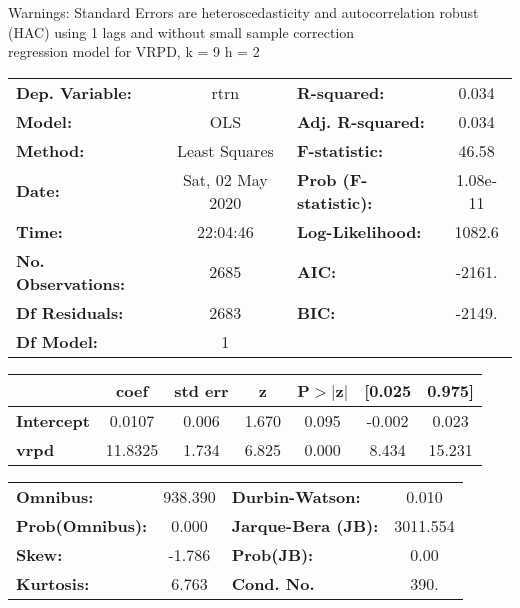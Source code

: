Warnings: \newline
 [1] Standard Errors are heteroscedasticity and autocorrelation robust (HAC) using 1 lags and without small sample correction\\ 

regression model for VRPD, k = 9 h = 2\begin{center}
\begin{tabular}{lclc}
\toprule
\textbf{Dep. Variable:}    &       rtrn       & \textbf{  R-squared:         } &     0.034   \\
\textbf{Model:}            &       OLS        & \textbf{  Adj. R-squared:    } &     0.034   \\
\textbf{Method:}           &  Least Squares   & \textbf{  F-statistic:       } &     46.58   \\
\textbf{Date:}             & Sat, 02 May 2020 & \textbf{  Prob (F-statistic):} &  1.08e-11   \\
\textbf{Time:}             &     22:04:46     & \textbf{  Log-Likelihood:    } &    1082.6   \\
\textbf{No. Observations:} &        2685      & \textbf{  AIC:               } &    -2161.   \\
\textbf{Df Residuals:}     &        2683      & \textbf{  BIC:               } &    -2149.   \\
\textbf{Df Model:}         &           1      & \textbf{                     } &             \\
\bottomrule
\end{tabular}
\begin{tabular}{lcccccc}
                   & \textbf{coef} & \textbf{std err} & \textbf{z} & \textbf{P$> |$z$|$} & \textbf{[0.025} & \textbf{0.975]}  \\
\midrule
\textbf{Intercept} &       0.0107  &        0.006     &     1.670  &         0.095        &       -0.002    &        0.023     \\
\textbf{vrpd}      &      11.8325  &        1.734     &     6.825  &         0.000        &        8.434    &       15.231     \\
\bottomrule
\end{tabular}
\begin{tabular}{lclc}
\textbf{Omnibus:}       & 938.390 & \textbf{  Durbin-Watson:     } &    0.010  \\
\textbf{Prob(Omnibus):} &   0.000 & \textbf{  Jarque-Bera (JB):  } & 3011.554  \\
\textbf{Skew:}          &  -1.786 & \textbf{  Prob(JB):          } &     0.00  \\
\textbf{Kurtosis:}      &   6.763 & \textbf{  Cond. No.          } &     390.  \\
\bottomrule
\end{tabular}
\end{center}

